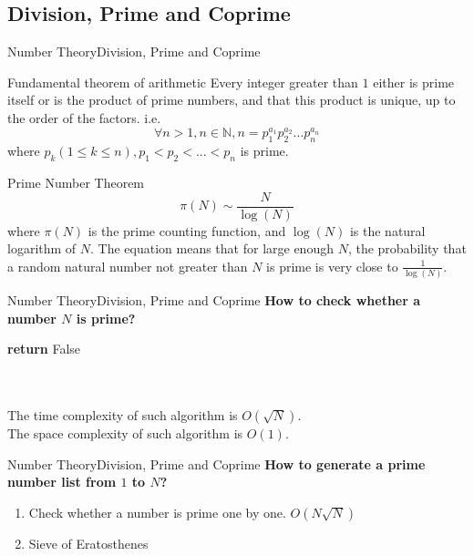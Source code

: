 \documentclass[10pt]{beamer}
\begin{document}
\subsection{Division, Prime and Coprime}
\begin{frame}{Number Theory}{Division, Prime and Coprime}
\begin{block}{Fundamental theorem of arithmetic}
    Every integer greater than $1$ either is prime itself or is the product of prime numbers, and that this product is unique, up to the order of the factors. i.e. $$\forall n > 1, n \in \mathbb{N}, n = p_1^{a_1}p_2^{a_2} ... p_n^{a_n}$$ where $p_k (1\leq k\leq n), p_1<p_2<...<p_n$ is prime. 
\end{block}
\pause
\begin{block}{Prime Number Theorem}
    \begin{equation}
		\pi(N) \sim	 \frac{N}{\log(N)} \nonumber
	\end{equation}
	where $\pi(N)$ is the prime counting function, and $\log(N)$ is the natural logarithm of $N$. The equation means that for large enough $N$, the probability that a random natural number not greater than $N$ is prime is very close to $\frac{1}{\log(N)}$.
\end{block}
\end{frame}


\begin{frame}{Number Theory}{Division, Prime and Coprime}
\textbf{\large How to check whether a number $N$ is prime?}
\begin{algorithm}[H]
\begin{algorithmic}[1]
			\STATE \textbf{return} False
		\ENDIF
	\ENDFOR
\end{algorithmic}
\caption*{Pseudo-code for prime number checking.}
\end{algorithm}
\pause
~\\~\\
The time complexity of such algorithm is $O(\sqrt{N})$. \\
The space complexity of such algorithm is $O(1)$.

\end{frame}


\begin{frame}{Number Theory}{Division, Prime and Coprime}
\textbf{\large How to generate a prime number list from $1$ to $N$?}
\begin{enumerate}
	\item Check whether a number is prime one by one. \pause $O(N\sqrt{N})$ \pause
	\item Sieve of Eratosthenes 
\end{enumerate}
\end{frame}
\end{document}
